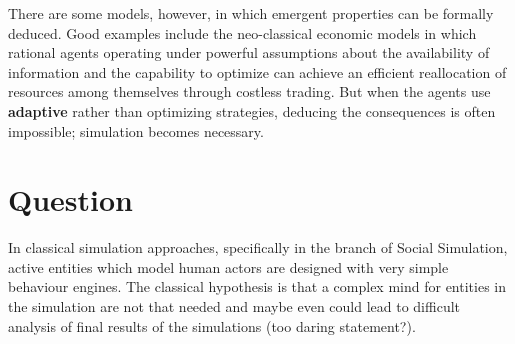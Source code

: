 \documentclass[11pt,oneside,a4paper,openright]{report}
\begin{document}
There are some models, however, in which emergent properties can be formally deduced. Good examples include the neo-classical economic models in which rational agents operating under powerful assumptions about the availability of information and the capability to optimize can achieve an efficient reallocation of resources among themselves through costless trading. But when the agents use \textbf{adaptive} rather than optimizing strategies, deducing the consequences is often impossible; simulation becomes necessary.

%
%
%
%
%
%
%
\section{Question} 

In classical simulation approaches, specifically in the branch of Social Simulation, active entities which model human actors are designed with very simple behaviour engines. The classical hypothesis is that a complex mind for entities in the simulation are not that needed and maybe even could lead to difficult analysis of final results of the simulations (too daring statement?). 
\end{document}
